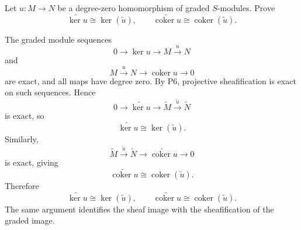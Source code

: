 \begin{problem}\label{prob:vi35-14}
Let \(u:M\to N\) be a degree-zero homomorphism of graded \(S\)-modules. Prove
\[
\widetilde{\ker u}\cong\ker(\widetilde u),
\qquad
\widetilde{\operatorname{coker}u}\cong\operatorname{coker}(\widetilde u).
\]

\end{problem}

\ifdefined\FullProblemDossiers
\begin{solution}
The graded module sequences
\[
0\to\ker u\to M\xrightarrow{u}N
\]
and
\[
M\xrightarrow{u}N\to\operatorname{coker}u\to0
\]
are exact, and all maps have degree zero. By P6, projective sheafification is exact on such sequences. Hence
\[
0\to\widetilde{\ker u}\to\widetilde M\xrightarrow{\widetilde u}\widetilde N
\]
is exact, so
\[
\widetilde{\ker u}\cong\ker(\widetilde u).
\]
Similarly,
\[
\widetilde M\xrightarrow{\widetilde u}\widetilde N
\to
\widetilde{\operatorname{coker}u}\to0
\]
is exact, giving
\[
\widetilde{\operatorname{coker}u}
\cong
\operatorname{coker}(\widetilde u).
\]
Therefore
\[
\boxed{
\widetilde{\ker u}\cong\ker(\widetilde u),
\qquad
\widetilde{\operatorname{coker}u}\cong\operatorname{coker}(\widetilde u).
}
\]
The same argument identifies the sheaf image with the sheafification of the graded image.
\end{solution}
\fi

